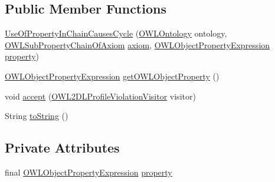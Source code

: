 \subsection*{Public Member Functions}
\begin{DoxyCompactItemize}
\item 
\hyperlink{classorg_1_1semanticweb_1_1owlapi_1_1profiles_1_1_use_of_property_in_chain_causes_cycle_a8cdd895ecbdf3e57f92ee969a8f7e8d4}{Use\-Of\-Property\-In\-Chain\-Causes\-Cycle} (\hyperlink{interfaceorg_1_1semanticweb_1_1owlapi_1_1model_1_1_o_w_l_ontology}{O\-W\-L\-Ontology} ontology, \hyperlink{interfaceorg_1_1semanticweb_1_1owlapi_1_1model_1_1_o_w_l_sub_property_chain_of_axiom}{O\-W\-L\-Sub\-Property\-Chain\-Of\-Axiom} \hyperlink{classorg_1_1semanticweb_1_1owlapi_1_1profiles_1_1_o_w_l_profile_violation_aa7c8e8910ed3966f64a2c003fb516214}{axiom}, \hyperlink{interfaceorg_1_1semanticweb_1_1owlapi_1_1model_1_1_o_w_l_object_property_expression}{O\-W\-L\-Object\-Property\-Expression} \hyperlink{classorg_1_1semanticweb_1_1owlapi_1_1profiles_1_1_use_of_property_in_chain_causes_cycle_af3010fe7d65aa08e19735875034a4131}{property})
\item 
\hyperlink{interfaceorg_1_1semanticweb_1_1owlapi_1_1model_1_1_o_w_l_object_property_expression}{O\-W\-L\-Object\-Property\-Expression} \hyperlink{classorg_1_1semanticweb_1_1owlapi_1_1profiles_1_1_use_of_property_in_chain_causes_cycle_a675cb96213691c16ebae97e80f07e54c}{get\-O\-W\-L\-Object\-Property} ()
\item 
void \hyperlink{classorg_1_1semanticweb_1_1owlapi_1_1profiles_1_1_use_of_property_in_chain_causes_cycle_aeb568743b94fef15ce285f90f06b9d78}{accept} (\hyperlink{interfaceorg_1_1semanticweb_1_1owlapi_1_1profiles_1_1_o_w_l2_d_l_profile_violation_visitor}{O\-W\-L2\-D\-L\-Profile\-Violation\-Visitor} visitor)
\item 
String \hyperlink{classorg_1_1semanticweb_1_1owlapi_1_1profiles_1_1_use_of_property_in_chain_causes_cycle_a79b744aa75e3984f2aee716c3e1adfab}{to\-String} ()
\end{DoxyCompactItemize}
\subsection*{Private Attributes}
\begin{DoxyCompactItemize}
\item 
final \hyperlink{interfaceorg_1_1semanticweb_1_1owlapi_1_1model_1_1_o_w_l_object_property_expression}{O\-W\-L\-Object\-Property\-Expression} \hyperlink{classorg_1_1semanticweb_1_1owlapi_1_1profiles_1_1_use_of_property_in_chain_causes_cycle_af3010fe7d65aa08e19735875034a4131}{property}
\end{DoxyCompactItemize}


